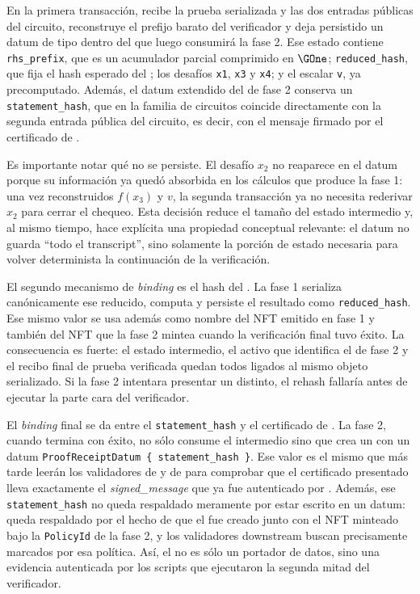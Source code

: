 En la primera transacción, \PhaseOneSetupTx recibe la prueba serializada y las dos entradas públicas del circuito, reconstruye el prefijo barato del verificador y deja persistido un datum de tipo \PhaseOneState dentro del \UTxO que luego consumirá la fase 2. Ese estado contiene \texttt{rhs\_prefix}, que es un acumulador parcial comprimido en $\GOne$; \texttt{reduced\_hash}, que fija el hash esperado del \ReducedRedeemer; los desafíos \texttt{x1}, \texttt{x3} y \texttt{x4}; y el escalar \texttt{v}, ya precomputado. Además, el datum extendido del \UTxO de fase 2 conserva un \texttt{statement\_hash}, que en la familia de circuitos \Lagrange coincide directamente con la segunda entrada pública del circuito, es decir, con el mensaje firmado por el certificado de \Mithril.

Es importante notar qué no se persiste. El desafío $x_2$ no reaparece en el datum porque su información ya quedó absorbida en los cálculos que produce la fase 1: una vez reconstruidos $f(x_3)$ y $v$, la segunda transacción ya no necesita rederivar $x_2$ para cerrar el chequeo. Esta decisión reduce el tamaño del estado intermedio y, al mismo tiempo, hace explícita una propiedad conceptual relevante: el datum no guarda ``todo el transcript'', sino solamente la porción de estado necesaria para volver determinista la continuación de la verificación.

El segundo mecanismo de \textit{binding} es el hash del \ReducedRedeemer. La fase 1 serializa canónicamente ese \redeemer reducido, computa \BLAKETwoSTwoFiveSix y persiste el resultado como \texttt{reduced\_hash}. Ese mismo valor se usa además como nombre del NFT emitido en fase 1 y también del NFT que la fase 2 mintea cuando la verificación final tuvo éxito. La consecuencia es fuerte: el estado intermedio, el activo que identifica el \UTxO de fase 2 y el recibo final de prueba verificada quedan todos ligados al mismo objeto serializado. Si la fase 2 intentara presentar un \ReducedRedeemer distinto, el rehash fallaría antes de ejecutar la parte cara del verificador.

El \textit{binding} final se da entre el \texttt{statement\_hash} y el certificado de \Mithril. La fase 2, cuando termina con éxito, no sólo consume el \UTxO intermedio sino que crea un \ProofReceipt con un datum \texttt{ProofReceiptDatum \{ statement\_hash \}}. Ese valor es el mismo que más tarde leerán los validadores de \StakeDistribution y de \MintTx para comprobar que el certificado presentado lleva exactamente el \textit{signed\_message} que ya fue autenticado por \MidnightSTMCircuit. Además, ese \texttt{statement\_hash} no queda respaldado meramente por estar escrito en un datum: queda respaldado por el hecho de que el \UTxO fue creado junto con el NFT minteado bajo la \texttt{PolicyId} de la fase 2, y los validadores downstream buscan precisamente \ProofReceipt marcados por esa política. Así, el \ProofReceipt no es sólo un portador de datos, sino una evidencia autenticada por los scripts que ejecutaron la segunda mitad del verificador.


